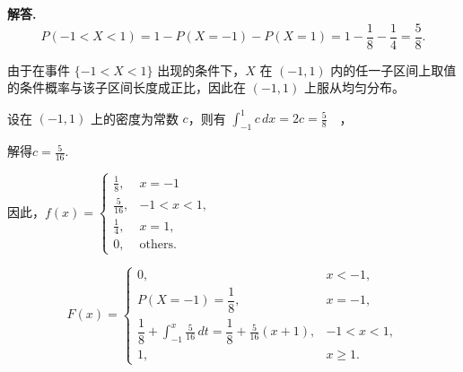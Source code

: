 \documentclass[12pt, a4paper, oneside]{ctexart}
\newenvironment{solution}{\par\noindent\textbf{解答. }}{\par}
\begin{document}
\begin{solution}
    \[
    P(-1<X<1) = 1 - P(X=-1) - P(X=1)
    = 1 - \frac{1}{8} - \frac{1}{4}
    = \frac{5}{8}.
    \]

    由于在事件 \(\{-1<X<1\}\) 出现的条件下，\(X\) 在 \((-1,1)\) 内的任一子区间上取值的条件概率与该子区间长度成正比，因此在 \((-1,1)\) 上服从均匀分布。

    设在 \((-1,1)\) 上的密度为常数 \(c\)，则有
    $\int_{-1}^{1} c \, dx = 2c = \frac{5}{8}\quad$，
    
    解得$c = \frac{5}{16}.$
    
    因此，$f(x) = \begin{cases}\frac18,&x=-1\\\frac{5}{16}, & -1 < x < 1,\\\frac14,&x=1, \\0,& \text{others.}\end{cases}$

    \[
    F(x)=
    \begin{cases}
    0, & x < -1,\\[6pt]
    P(X=-1)=\dfrac{1}{8}, & x = -1,\\[6pt]
    \dfrac{1}{8} + \displaystyle\int_{-1}^{x} \frac{5}{16}\,dt
    = \dfrac{1}{8} + \frac{5}{16}(x+1), & -1 < x < 1,\\[8pt]
    1, & x \ge 1.
    \end{cases}
    \]
    

\end{solution}
\end{document}

